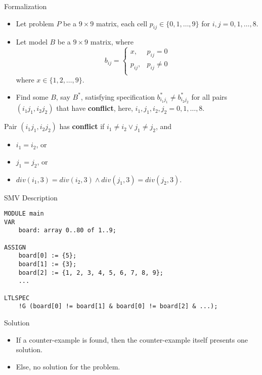 \documentclass[11pt]{beamer}
\renewcommand{\r}{\alert}
\theoremstyle{definition}
\begin{document}
\begin{frame}{Formalization}
    \begin{itemize}
        \item Let \r{problem} $P$ be a $9 \times 9$ matrix, each cell $p_{ij} \in \{0, 1, \ldots, 9\}$ for $i, j=0,1,\ldots,8$.
        \item Let \r{model} $B$ be a $9 \times 9$ matrix, where $$b_{ij} = \left\{
            \begin{array}{ll}
                x, & p_{ij}=0 \\
                p_{ij}, & p_{ij} \not=0 \\
            \end{array}
        \right.$$ where $x \in \{1, 2, \dots, 9\}$.
        \item Find some $B$, say $B^*$, satisfying \r{specification} $b_{i_1 j_1}^* \not= b_{i_2 j_2}^*$ for all pairs $(i_1 j_1, i_2 j_2)$ that have \textbf{conflict}, here, $i_1, j_1, i_2, j_2=0,1,\ldots,8$.
    \end{itemize}
    \pause
    \begin{definition}
        Pair $(i_1 j_1, i_2 j_2)$ has \textbf{conflict} if $i_1 \not= i_2 \vee j_1 \not= j_2$, and
        \begin{itemize}
            \item $i_1 = i_2$, or
            \item $j_1 = j_2$, or
            \item $div(i_1, 3) = div(i_2, 3) \wedge div(j_1, 3) = div(j_2, 3)$.
        \end{itemize}
    \end{definition}
\end{frame}

\begin{frame}[fragile]{SMV Description}
    \begin{lstlisting}
MODULE main
VAR
    board: array 0..80 of 1..9;

ASSIGN
    board[0] := {5};
    board[1] := {3};
    board[2] := {1, 2, 3, 4, 5, 6, 7, 8, 9};
    ...

LTLSPEC
    !G (board[0] != board[1] & board[0] != board[2] & ...);
    \end{lstlisting}
\end{frame}

\begin{frame}{Solution}
    \begin{itemize}
        \item If a counter-example is found, then the counter-example itself presents one solution.
        \item Else, no solution for the problem.
    \end{itemize}
\end{frame}
\end{document}
